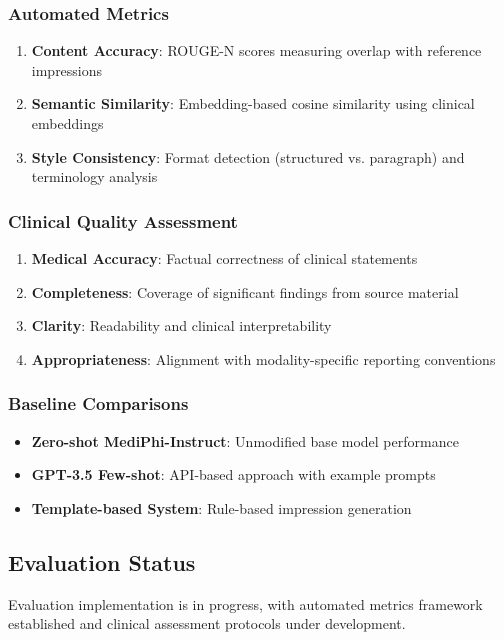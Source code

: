 \documentclass[11pt,letterpaper]{article}
\begin{document}
\subsubsection{Automated Metrics}
\begin{enumerate}
    \item \textbf{Content Accuracy}: ROUGE-N scores measuring overlap with reference impressions
    \item \textbf{Semantic Similarity}: Embedding-based cosine similarity using clinical embeddings
    \item \textbf{Style Consistency}: Format detection (structured vs. paragraph) and terminology analysis
\end{enumerate}

\subsubsection{Clinical Quality Assessment}
\begin{enumerate}
    \item \textbf{Medical Accuracy}: Factual correctness of clinical statements
    \item \textbf{Completeness}: Coverage of significant findings from source material
    \item \textbf{Clarity}: Readability and clinical interpretability
    \item \textbf{Appropriateness}: Alignment with modality-specific reporting conventions
\end{enumerate}

\subsubsection{Baseline Comparisons}
\begin{itemize}
    \item \textbf{Zero-shot MediPhi-Instruct}: Unmodified base model performance
    \item \textbf{GPT-3.5 Few-shot}: API-based approach with example prompts
    \item \textbf{Template-based System}: Rule-based impression generation
\end{itemize}

\subsection{Evaluation Status}
Evaluation implementation is in progress, with automated metrics framework established and clinical assessment protocols under development.
\end{document}
